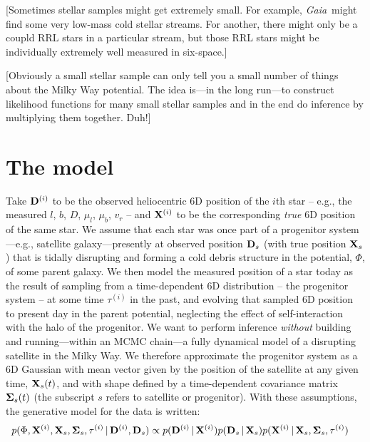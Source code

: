 \documentclass[letterpaper,12pt,preprint]{aastex}
\newcommand{\project}[1]{\textsl{#1}}
\newcommand{\gaia}{\project{Gaia}}
\newcommand{\given}{\,|\,}
\newcommand{\D}{{\bf D}}
\newcommand{\X}{{\bf X}}
\newcommand{\bSigma}{{\bf \Sigma}}
\begin{document}
[Sometimes stellar samples might get extremely small.  For example,
  \gaia\ might find some very low-mass cold stellar streams.  For
  another, there might only be a coupld RRL stars in a particular
  stream, but those RRL stars might be individually extremely well
  measured in six-space.]

[Obviously a small stellar sample can only tell you a small number of
  things about the Milky Way potential.  The idea is---in the long
  run---to construct likelihood functions for many small stellar
  samples and in the end do inference by multiplying them together.
  Duh!]

\section{The model}

Take ${\bf D}^{(i)}$ to be the observed heliocentric 6D position of the $i$th star -- e.g., the measured $l$, $b$, $D$, $\mu_l$, $\mu_b$, $v_r$ -- and ${\bf X}^{(i)}$ to be the corresponding \emph{true} 6D position of the same star. We assume that each star was once part of a progenitor system---e.g., satellite galaxy---presently at observed position ${\bf D}_s$ (with true position ${\bf X}_s$) that is tidally disrupting and forming a cold debris structure in the potential, $\Phi$, of some parent galaxy. We then model the measured position of a star today as the result of sampling from a time-dependent 6D distribution -- the progenitor system -- at some time $\tau^{(i)}$ in the past, and evolving that sampled 6D position to present day in the parent potential, neglecting the effect of self-interaction with the halo of the progenitor. We want to perform inference \emph{without} building and running---within an MCMC chain---a fully dynamical model of a disrupting satellite in the Milky Way. We therefore approximate the progenitor system as a 6D Gaussian with mean vector given by the position of the satellite at any given time, ${\bf X}_s(t)$, and with shape defined by a time-dependent covariance matrix $\bSigma_s(t)$ (the subscript $s$ refers to satellite or progenitor). With these assumptions, the generative model for the data is written:
\begin{align}
	p(\Phi, \X^{(i)}, \X_s, \bSigma_s, \tau^{(i)} \given \D^{(i)}, \D_s) &\propto 
		p(\D^{(i)} \given \X^{(i)}) p(\D_s \given \X_s) p(\X^{(i)} \given \X_s, \bSigma_s, \tau^{(i)})
\end{align}
\end{document}
